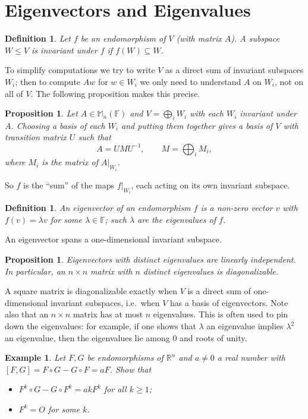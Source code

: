 \documentclass[12pt]{article}
\theoremstyle{breakplain}
\newtheorem{prop}[theorem]{Proposition}
\theoremstyle{breakdef}
\newtheorem{definition}[theorem]{Definition}
\newtheorem*{example}{Example}
\theoremstyle{remark}
\begin{document}
\section{Eigenvectors and Eigenvalues}
\begin{definition}
    Let $f$ be an endomorphism of $V$ (with matrix $A$). A subspace $W\leq V$ is \emph{invariant} under $f$ if $f(W)\subseteq W$.
\end{definition}
To simplify computations we try to write $V$ as a direct sum of invariant subspaces $W_i$; then to compute $Aw$ for $w\in W_i$ we only need to understand $A$ on $W_i$, not on all of $V$.
The following proposition makes this precise.
\begin{prop}
    Let $A\in\mathbb{M}_n(\mathbb{F})$ and $V=\bigoplus_i W_i$ with each $W_i$ invariant under $A$. Choosing a basis of each $W_i$ and putting them together gives a basis of $V$ with transition matrix $U$ such that
    \[A =UMU^{-1},\qquad M=\bigoplus_i M_i,\]
    where $M_i$ is the matrix of $A|_{W_i}$.
\end{prop}
So $f$ is the ``sum'' of the maps $f|_{W_i}$, each acting on its own invariant subspace.
\begin{definition}
    An \emph{eigenvector} of an endomorphism $f$ is a non-zero vector $v$ with $f(v)=\lambda v$ for some $ \lambda \in \mathbb{F} $; such $ \lambda $ are the \emph{eigenvalues} of $f$.
\end{definition}
An eigenvector spans a one-dimensional invariant subspace.
\begin{prop}
    Eigenvectors with distinct eigenvalues are linearly independent. In particular, an $n\times n$ matrix with $n$ distinct eigenvalues is diagonalizable.
\end{prop}
A square matrix is diagonalizable exactly when $V$ is a direct sum of one-dimensional invariant subspaces, i.e.\ when $V$ has a basis of eigenvectors. Note also that an $n\times n$ matrix has at most $n$ eigenvalues. This is often used to pin down the eigenvalues: for example, if one shows that $\lambda$ an eigenvalue implies $\lambda^2$ an eigenvalue, then the eigenvalues lie among $0$ and roots of unity.
\begin{example}
    Let $F,G$ be endomorphisms of $\mathbb{R}^n$ and $a\neq 0$ a real number with $[F,G]=F\circ G-G\circ F=aF$. Show that
    \begin{itemize}
        \item $F^k\circ G- G\circ F^k=akF^k$ for all $k\geq 1$;
        \item $F^k=O$ for some $k$.
    \end{itemize}
\end{example}
\end{document}

